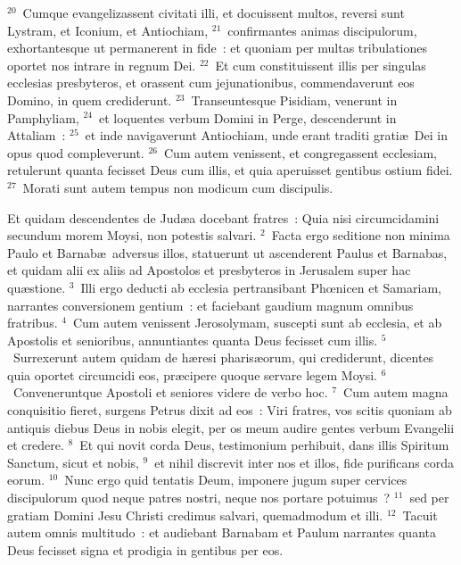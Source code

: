 ${}^{20}$~Cumque evangelizassent civitati illi, et docuissent multos, reversi sunt Lystram, et Iconium, et Antiochiam,
${}^{21}$~confirmantes animas discipulorum, exhortantesque ut permanerent in fide~: et quoniam per multas tribulationes oportet nos intrare in regnum Dei.
${}^{22}$~Et cum constituissent illis per singulas ecclesias presbyteros, et orassent cum jejunationibus, commendaverunt eos Domino, in quem crediderunt.
${}^{23}$~Transeuntesque Pisidiam, venerunt in Pamphyliam,
${}^{24}$~et loquentes verbum Domini in Perge, descenderunt in Attaliam~:
${}^{25}$~et inde navigaverunt Antiochiam, unde erant traditi grati\ae\ Dei in opus quod compleverunt.
${}^{26}$~Cum autem venissent, et congregassent ecclesiam, retulerunt quanta fecisset Deus cum illis, et quia aperuisset gentibus ostium fidei.
${}^{27}$~Morati sunt autem tempus non modicum cum discipulis.

\lettrine[lines=3,image=true,loversize=0.05,lraise=-0.03]{E}{}t quidam descendentes de Jud\ae a docebant fratres~: Quia nisi circumcidamini secundum morem Moysi, non potestis salvari.
${}^{2}$~Facta ergo seditione non minima Paulo et Barnab\ae\ adversus illos, statuerunt ut ascenderent Paulus et Barnabas, et quidam alii ex aliis ad Apostolos et presbyteros in Jerusalem super hac qu\ae stione.
${}^{3}$~Illi ergo deducti ab ecclesia pertransibant Phœnicen et Samariam, narrantes conversionem gentium~: et faciebant gaudium magnum omnibus fratribus.
${}^{4}$~Cum autem venissent Jerosolymam, suscepti sunt ab ecclesia, et ab Apostolis et senioribus, annuntiantes quanta Deus fecisset cum illis.
${}^{5}$~Surrexerunt autem quidam de h\ae resi pharis\ae orum, qui crediderunt, dicentes quia oportet circumcidi eos, pr\ae cipere quoque servare legem Moysi.
${}^{6}$~Conveneruntque Apostoli et seniores videre de verbo hoc.
${}^{7}$~Cum autem magna conquisitio fieret, surgens Petrus dixit ad eos~: Viri fratres, vos scitis quoniam ab antiquis diebus Deus in nobis elegit, per os meum audire gentes verbum Evangelii et credere.
${}^{8}$~Et qui novit corda Deus, testimonium perhibuit, dans illis Spiritum Sanctum, sicut et nobis,
${}^{9}$~et nihil discrevit inter nos et illos, fide purificans corda eorum.
${}^{10}$~Nunc ergo quid tentatis Deum, imponere jugum super cervices discipulorum quod neque patres nostri, neque nos portare potuimus~?
${}^{11}$~sed per gratiam Domini Jesu Christi credimus salvari, quemadmodum et illi.
${}^{12}$~Tacuit autem omnis multitudo~: et audiebant Barnabam et Paulum narrantes quanta Deus fecisset signa et prodigia in gentibus per eos.


